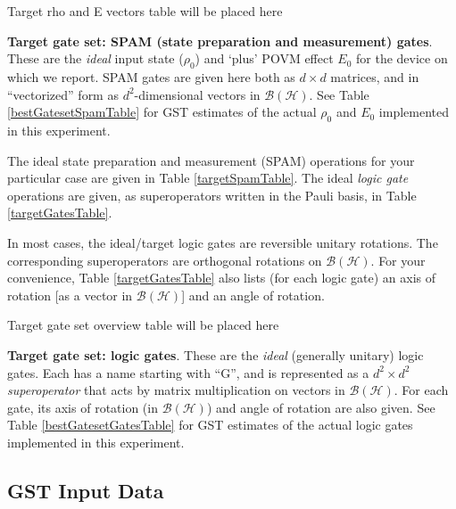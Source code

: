 \documentclass{article}[11pt]
\newcommand{\putfield}[2]{#2}
\begin{document}
\begin{table}[h]
\begin{center}
\putfield{targetSpamTable}{Target rho and E vectors table will be placed here}
\caption{\putfield{tt_targetSpamTable}{}\textbf{Target gate set: SPAM (state preparation and measurement) gates}.  These are the \emph{ideal} input state ($\rho_0$) and `plus' POVM effect $E_0$ for the device on which we report.  SPAM gates are given here both as $d\times d$ matrices, and in ``vectorized'' form as $d^2$-dimensional vectors in $\mathcal{B}(\mathcal{H})$.  See Table \ref{bestGatesetSpamTable} for GST estimates of the actual $\rho_0$ and $E_0$ implemented in this experiment.\label{targetSpamTable}}
\end{center}
\end{table}

The ideal state preparation and measurement (SPAM) operations for your particular case are given in Table \ref{targetSpamTable}.  The ideal \emph{logic gate} operations are given, as superoperators written in the Pauli basis, in Table \ref{targetGatesTable}.

In most cases, the ideal/target logic gates are reversible unitary rotations.  The corresponding superoperators are orthogonal rotations on $\mathcal{B}(\mathcal{H})$.  For your convenience, Table \ref{targetGatesTable} also lists (for each logic gate) an axis of rotation [as a vector in $\mathcal{B}(\mathcal{H})$] and an angle of rotation.  

\begin{table}[h]
\begin{center}
\putfield{targetGatesTable}{Target gate set overview table will be placed here}
\caption{\putfield{tt_targetGatesTable}{}\textbf{Target gate set: logic gates}.  These are the \emph{ideal} (generally unitary) logic gates.  Each has a name starting with ``G'', and is represented as a $d^2\times d^2$ \emph{superoperator} that acts by matrix multiplication on vectors in $\mathcal{B}(\mathcal{H})$.  For each gate, its axis of rotation (in $\mathcal{B}(\mathcal{H})$) and angle of rotation are also given.  See Table \ref{bestGatesetGatesTable} for GST estimates of the actual logic gates implemented in this experiment.\label{targetGatesTable}}
\end{center}
\end{table}

\subsection{GST Input Data}
\end{document}
